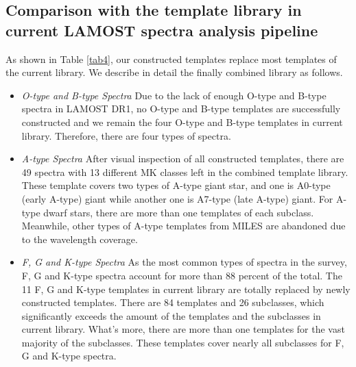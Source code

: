 \documentclass[manuscript]{aastex}
\begin{document}
\subsection{Comparison with the  template library in current LAMOST spectra analysis pipeline}
As shown in Table \ref{tab4},
our constructed templates replace most templates of the  current library.
We describe in detail the finally combined library as follows.
\begin{itemize}
\item \emph{O-type and B-type Spectra} Due to the lack of enough O-type and B-type spectra in LAMOST DR1,
no O-type and B-type templates are successfully constructed and we remain the four O-type and B-type templates in current library.
Therefore, there are four types of spectra.
\item \emph{A-type Spectra}
After visual inspection of all constructed templates,
there are 49 spectra with 13 different MK classes  left in the combined template library.
These template covers two types of A-type giant star,
and one is A0-type (early A-type) giant while another one is A7-type (late A-type) giant.
For A-type dwarf stars,
there are more than one templates of each subclass.
Meanwhile,
other types of A-type templates from MILES are abandoned due to the wavelength coverage.
\item \emph{F, G and K-type Spectra} As the most common types of spectra in the survey,
F, G and K-type spectra account for more than 88 percent of the total.
The 11 F, G and K-type templates in current library are totally replaced by newly constructed templates.
There are 84 templates and 26 subclasses,
which significantly exceeds the amount of the templates and the subclasses in current library.
What's more,
there are more than one templates for the vast majority of the subclasses.
These templates cover nearly all subclasses for F, G and K-type spectra.


\end{itemize}
\end{document}
